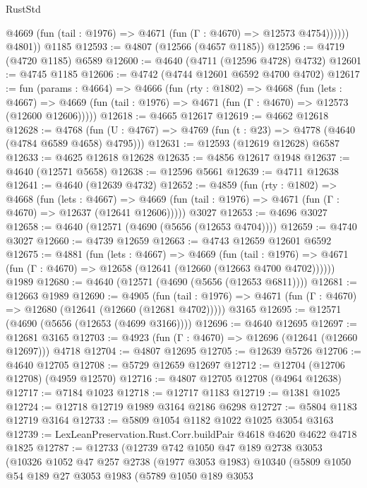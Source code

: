 \begin{lexlean}{RustStd}
\begin{coremodule}
              @4669 (fun (tail : @1976) => @4671 (fun (Γ : @4670) => @12573 @4754))))))
        @4801))
    @1185
@12593 := @4807 (@12566 (@4657 @1185))
@12596 := @4719 (@4720 @1185) @6589
@12600 := @4640 (@4711 (@12596 @4728) @4732)
@12601 := @4745 @1185
@12606 := @4742 (@4744 @12601 @6592 @4700 @4702)
@12617 := fun (params : @4664) =>
  @4666
    (fun (rty : @1802) =>
    @4668
      (fun (lets : @4667) =>
      @4669 (fun (tail : @1976) => @4671 (fun (Γ : @4670) => @12573 (@12600 @12606)))))
@12618 := @4665 @12617
@12619 := @4662 @12618
@12628 := @4768
    (fun (U : @4767) => @4769 (fun (t : @23) => @4778 (@4640 (@4784 @6589 @4658) @4795)))
@12631 := @12593 (@12619 @12628) @6587
@12633 := @4625 @12618 @12628
@12635 := @4856 @12617 @1948
@12637 := @4640 (@12571 @5658)
@12638 := @12596 @5661
@12639 := @4711 @12638
@12641 := @4640 (@12639 @4732)
@12652 := @4859
    (fun (rty : @1802) =>
    @4668
      (fun (lets : @4667) =>
      @4669 (fun (tail : @1976) => @4671 (fun (Γ : @4670) => @12637 (@12641 @12606)))))
    @3027
@12653 := @4696 @3027
@12658 := @4640 (@12571 (@4690 (@5656 (@12653 @4704))))
@12659 := @4740 @3027
@12660 := @4739 @12659
@12663 := @4743 @12659 @12601 @6592
@12675 := @4881
    (fun (lets : @4667) =>
    @4669
      (fun (tail : @1976) =>
      @4671 (fun (Γ : @4670) => @12658 (@12641 (@12660 (@12663 @4700 @4702))))))
    @1989
@12680 := @4640 (@12571 (@4690 (@5656 (@12653 @6811))))
@12681 := @12663 @1989
@12690 := @4905
    (fun (tail : @1976) => @4671 (fun (Γ : @4670) => @12680 (@12641 (@12660 (@12681 @4702)))))
    @3165
@12695 := @12571 (@4690 (@5656 (@12653 (@4699 @3166))))
@12696 := @4640 @12695
@12697 := @12681 @3165
@12703 := @4923 (fun (Γ : @4670) => @12696 (@12641 (@12660 @12697))) @4718
@12704 := @4807 @12695
@12705 := @12639 @5726
@12706 := @4640 @12705
@12708 := @5729 @12659 @12697
@12712 := @12704 (@12706 @12708) (@4959 @12570)
@12716 := @4807 @12705 @12708 (@4964 @12638)
@12717 := @7184 @1023
@12718 := @12717 @1183
@12719 := @1381 @1025
@12724 := @12718 @12719 @1989 @3164 @2186 @6298
@12727 := @5804 @1183 @12719 @3164
@12733 := @5809 @1054 @1182 @1022 @1025 @3054 @3163
@12739 := LexLeanPreservation.Rust.Corr.buildPair @4618 @4620 @4622 @4718 @1825
@12787 := @12733
    (@12739
      @742
      @1050
      @47
      @189
      @2738
      @3053
      (@10326
        @1052
        @47
        @257
        @2738
        (@1977 @3053 @1983)
        @10340
        (@5809
          @1050
          @54
          @189
          @27
          @3053
          @1983
          (@5789
            @1050
            @189
            @3053

\end{coremodule}
\end{lexlean}
